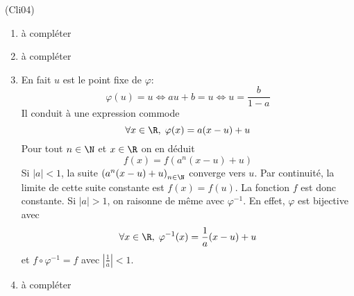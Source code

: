 \begin{tiny}(Cli04)\end{tiny}
\begin{enumerate}
  \item à compléter
  \item à compléter
  \item En fait $u$ est le point fixe de $\varphi$:
\begin{displaymath}
  \varphi(u) = u \Leftrightarrow au+b = u \Leftrightarrow u = \frac{b}{1-a}
\end{displaymath}
Il conduit à une expression commode
\begin{displaymath}
\forall x\in \R,\; \varphi(x) = a(x-u) + u  
\end{displaymath}
Pour tout $n\in \N$ et $x\in \R$ on en déduit
\begin{displaymath}
  f(x) = f(a^n(x-u) + u)
\end{displaymath}
Si $|a|<1$, la suite $\left( a^n(x-u) + u\right)_{n\in \N}$ converge vers $u$. Par continuité, la limite de cette suite constante est $f(x) = f(u)$.
La fonction $f$ est donc constante. \newline
Si $|a|>1$, on raisonne de même avec $\varphi^{-1}$. En effet, $\varphi$ est bijective avec
\begin{displaymath}
\forall x\in \R,\; \varphi^{-1}(x) = \frac{1}{a}(x-u) + u 
\end{displaymath}
et $f\circ \varphi^{-1} =f$ avec $\left| \frac{1}{a}\right| <1$.
\item à compléter
\end{enumerate}
